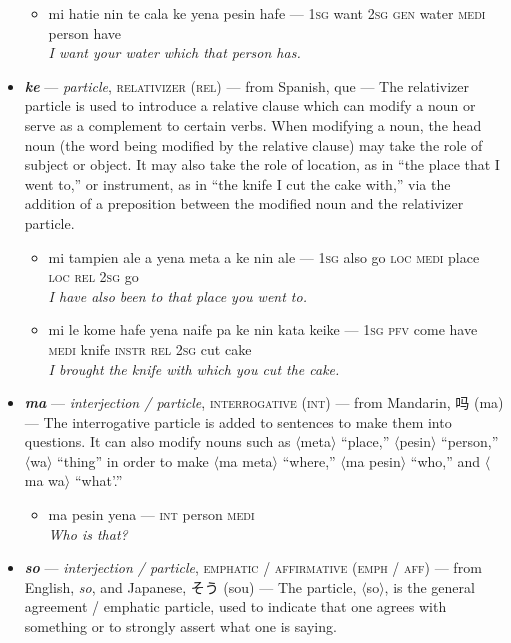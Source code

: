 \documentclass[a4paper]{article}
\begin{document}
\begin{itemize}
	\begin{itemize}
		\item mi hatie nin te cala ke yena pesin hafe — \textsc{1sg} want \textsc{2sg gen} water \textsc{medi} person have \\\textit{I want your water which that person has.}
	\end{itemize}
	\item \textbf{\textit{ke}} —  \textit{particle}, \textsc{relativizer (rel)} — from Spanish, que — The relativizer particle is used to introduce a relative clause which can modify a noun or serve as a complement to certain verbs. When modifying a noun, the head noun (the word being modified by the relative clause) may take the role of subject or object. It may also take the role of location, as in ``the place that I went to,'' or instrument, as in ``the knife I cut the cake with,'' via the addition of a preposition between the modified noun and the relativizer particle.
	\begin{itemize}
		\item mi tampien ale a yena meta a ke nin ale — \textsc{1sg} also go \textsc{loc medi} place \textsc{loc rel 2sg} go \\\textit{I have also been to that place you went to.}
		\item mi le kome hafe yena naife pa ke nin kata keike — \textsc{1sg pfv} come have \textsc{medi} knife \textsc{instr rel 2sg} cut cake \\\textit{I brought the knife with which you cut the cake.}
	\end{itemize}
	\item \textbf{\textit{ma}} —  \textit{interjection / particle}, \textsc{interrogative (int)} — from Mandarin, 吗 (ma) — The interrogative particle is added to sentences to make them into questions. It can also modify nouns such as $\langle$meta$\rangle$ ``place,'' $\langle$pesin$\rangle$ ``person,'' $\langle$wa$\rangle$ ``thing'' in order to make $\langle$ma meta$\rangle$ ``where,'' $\langle$ma pesin$\rangle$ ``who,'' and $\langle$ma wa$\rangle$ ``what'.''
	\begin{itemize}
		\item ma pesin yena — \textsc{int} person \textsc{medi} \\\textit{Who is that?}
	\end{itemize}
	\item \textbf{\textit{so}} — \textit{interjection / particle}, \textsc{emphatic / affirmative (emph / aff)} — from English, \textit{so}, and Japanese, そう (sou) — The particle, $\langle$so$\rangle$, is the general agreement / emphatic particle, used to indicate that one agrees with something or to strongly assert what one is saying.

\end{itemize}
\end{document}
